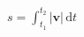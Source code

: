 \documentclass[border=2.5pt]{standalone}
\begin{document}
$\displaystyle s=\int_{t_1}^{t_2}|\boldsymbol v|\,\mathrm dt$
\end{document}
